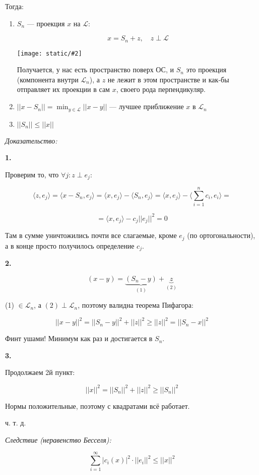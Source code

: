 \documentclass{article}
\def\images#1#2{\begin{center}\texttt{[image: static/\#2]}\end{center}}
\def\sk#1#2{\langle #1, #2 \rangle}
\begin{document}
Тогда:

\begin{enumerate}
    \item $S_n$ --- проекция $x$ на $\mathcal{L}$:
    
    \[x = S_n + z, \quad z \perp \mathcal{L}\]

    \images{0.3}{ner_bessel.jpg}

    Получается, у нас есть пространство поверх ОС, и $S_n$ это проекция (компонента внутри $\mathcal{L}_n$), а $z$ не лежит в этом пространстве и как-бы отправляет их проекции в сам $x$, своего рода перпендикуляр.

    \item $||x - S_n|| = \min_{y \in \mathcal{L}} ||x - y||$ --- лучшее приближение $x$ в $\mathcal{L}_n$
    \item $||S_n|| \le ||x||$
\end{enumerate}

\textit{Доказательство:}

\textbf{1. }

Проверим то, что $\forall j: z \perp e_j$: 

\[\sk{z}{e_j} = \sk{x - S_n}{e_j} = \sk{x}{e_j} - \sk{S_n}{e_j} = \sk{x}{e_j} - \sk{\sum_{i = 1}^{n} c_i}{e_i} =\]

\[= \sk{x}{e_j} - c_j ||e_j||^2 = 0\]

Там в сумме уничтожились почти все слагаемые, кроме $e_j$ (по ортогональности), а в конце просто получилось определение $c_j$.

\textbf{2. }

\[(x - y) = \underbrace{(S_n - y)}_{(1)}+ \underbrace{z}_{(2)}\]

(1) $\in \mathcal{L}_n$, а $(2) \perp \mathcal{L}_n$, поэтому валидна теорема Пифагора:

\[||x - y||^2 = ||S_n - y||^2 + ||z||^2 \ge ||z||^2 = ||S_n - x||^2\]

Финт ушами! Минимум как раз и достигается в $S_n$.

\textbf{3. }

Продолжаем 2й пункт:

\[||x||^2 = ||S_n||^2 + ||z||^2 \ge ||S_n||^2\]

Нормы положительные, поэтому с квадратами всё работает.

ч. т. д. 

\textit{Следствие (неравенство Бесселя): }

\[\sum_{i = 1}^{\infty} |c_i(x)|^2 \cdot ||e_i||^2 \le ||x||^2\]
\end{document}
